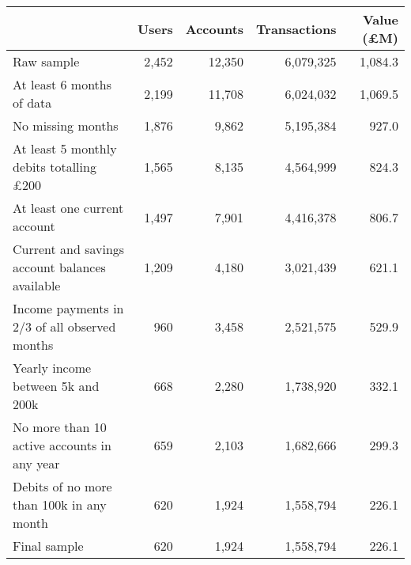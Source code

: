 \begin{tabular}{lrrrr}
\toprule
                                               & Users & Accounts & Transactions & Value (\pounds M) \\
\midrule
                                    Raw sample & 2,452 &   12,350 &    6,079,325 &           1,084.3 \\
                     At least 6 months of data & 2,199 &   11,708 &    6,024,032 &           1,069.5 \\
                             No missing months & 1,876 &    9,862 &    5,195,384 &             927.0 \\
At least 5 monthly debits totalling \pounds200 & 1,565 &    8,135 &    4,564,999 &             824.3 \\
                  At least one current account & 1,497 &    7,901 &    4,416,378 &             806.7 \\
Current and savings account balances available & 1,209 &    4,180 &    3,021,439 &             621.1 \\
 Income payments in 2/3 of all observed months &   960 &    3,458 &    2,521,575 &             529.9 \\
             Yearly income between 5k and 200k &   668 &    2,280 &    1,738,920 &             332.1 \\
   No more than 10 active accounts in any year &   659 &    2,103 &    1,682,666 &             299.3 \\
      Debits of no more than 100k in any month &   620 &    1,924 &    1,558,794 &             226.1 \\
                                  Final sample &   620 &    1,924 &    1,558,794 &             226.1 \\
\bottomrule
\end{tabular}

